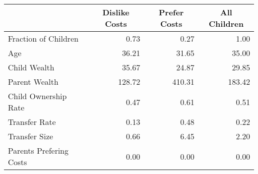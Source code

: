\begin{tabular}{l rrr}
\toprule
  &  \multicolumn{1}{c}{Dislike Costs } & \multicolumn{1}{c}{Prefer Costs } & \multicolumn{1}{c}{All Children}\\
\midrule
Fraction of Children & 0.73 & 0.27 & 1.00\\
Age & 36.21 & 31.65 & 35.00\\
Child Wealth & 35.67 & 24.87 & 29.85\\
Parent Wealth & 128.72 & 410.31 & 183.42\\
Child Ownership Rate & 0.47 & 0.61 & 0.51\\
Transfer Rate & 0.13 & 0.48 & 0.22\\
Transfer Size & 0.66 & 6.45 & 2.20\\
Parents Prefering Costs & 0.00 & 0.00 & 0.00\\
\bottomrule
\end{tabular}
